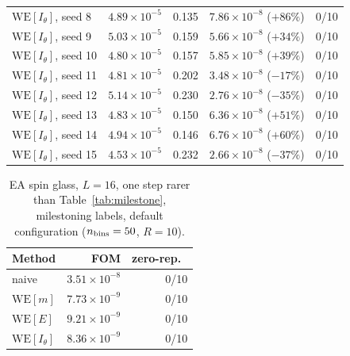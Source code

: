 \documentclass[11pt]{article}
\begin{document}
\begin{table}[h]
\begin{tabular}{lrrrr}
		$\mathrm{WE}[I_\theta]$, seed 8 & $4.89\times10^{-5}$ & 0.135 &
		$7.86\times10^{-8}$ ($+86\%$) & 0/10 \\
		$\mathrm{WE}[I_\theta]$, seed 9 & $5.03\times10^{-5}$ & 0.159 &
		$5.66\times10^{-8}$ ($+34\%$) & 0/10 \\
		$\mathrm{WE}[I_\theta]$, seed 10 & $4.80\times10^{-5}$ & 0.157 &
		$5.85\times10^{-8}$ ($+39\%$) & 0/10 \\
		$\mathrm{WE}[I_\theta]$, seed 11 & $4.81\times10^{-5}$ & 0.202 &
		$3.48\times10^{-8}$ ($-17\%$) & 0/10 \\
		$\mathrm{WE}[I_\theta]$, seed 12 & $5.14\times10^{-5}$ & 0.230 &
		$2.76\times10^{-8}$ ($-35\%$) & 0/10 \\
		$\mathrm{WE}[I_\theta]$, seed 13 & $4.83\times10^{-5}$ & 0.150 &
		$6.36\times10^{-8}$ ($+51\%$) & 0/10 \\
		$\mathrm{WE}[I_\theta]$, seed 14 & $4.94\times10^{-5}$ & 0.146 &
		$6.76\times10^{-8}$ ($+60\%$) & 0/10 \\
		$\mathrm{WE}[I_\theta]$, seed 15 & $4.53\times10^{-5}$ & 0.232 &
		$2.66\times10^{-8}$ ($-37\%$) & 0/10 \\
		\bottomrule
	\end{tabular}
\end{table}

\begin{table}[h]
	\centering\small
	\caption{EA spin glass, $L=16$, one step rarer than Table~\ref{tab:milestone}, milestoning
		labels, default configuration ($n_{\rm bins}=50$, $R=10$).}
	\label{tab:milestone2}
	\begin{tabular}{lrr}
		\toprule
		Method & FOM & zero-rep.\ \\
		\midrule
		naive & $3.51\times10^{-8}$ & 0/10 \\
		$\mathrm{WE}[m]$ & $7.73\times10^{-9}$ & 0/10 \\
		$\mathrm{WE}[E]$ & $9.21\times10^{-9}$ & 0/10 \\
		$\mathrm{WE}[I_\theta]$ & $8.36\times10^{-9}$ & 0/10 \\
		\bottomrule
	\end{tabular}
\end{table}
\end{document}
